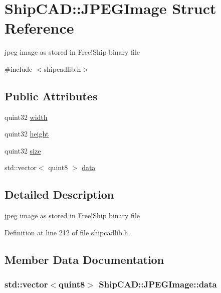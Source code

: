 \hypertarget{structShipCAD_1_1JPEGImage}{}\section{Ship\+C\+AD\+:\+:J\+P\+E\+G\+Image Struct Reference}
\label{structShipCAD_1_1JPEGImage}


jpeg image as stored in Free!\+Ship binary file  




{\ttfamily \#include $<$shipcadlib.\+h$>$}

\subsection*{Public Attributes}
\begin{DoxyCompactItemize}
\item 
quint32 \hyperlink{structShipCAD_1_1JPEGImage_aef2620e748540276be24c0275620870b}{width}
\item 
quint32 \hyperlink{structShipCAD_1_1JPEGImage_a35650ffa91785a63ba6f31cd87e208a2}{height}
\item 
quint32 \hyperlink{structShipCAD_1_1JPEGImage_a7e28010a6fb1d0c2926f8381b2e29931}{size}
\item 
std\+::vector$<$ quint8 $>$ \hyperlink{structShipCAD_1_1JPEGImage_aa1ec94e32147a6e39de7809b45604e21}{data}
\end{DoxyCompactItemize}


\subsection{Detailed Description}
jpeg image as stored in Free!\+Ship binary file 

Definition at line 212 of file shipcadlib.\+h.



\subsection{Member Data Documentation}
\subsubsection[{\texorpdfstring{data}{data}}]{\setlength{\rightskip}{0pt plus 5cm}std\+::vector$<$quint8$>$ Ship\+C\+A\+D\+::\+J\+P\+E\+G\+Image\+::data}\hypertarget{structShipCAD_1_1JPEGImage_aa1ec94e32147a6e39de7809b45604e21}{}\label{structShipCAD_1_1JPEGImage_aa1ec94e32147a6e39de7809b45604e21}



